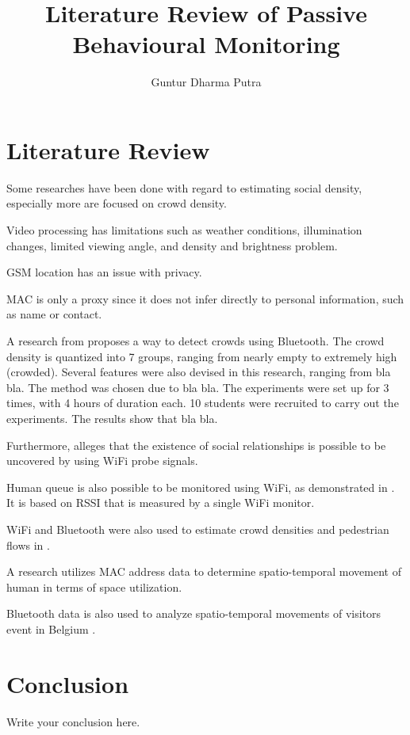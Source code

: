\documentclass{article}
\begin{document}
\title{Literature Review of Passive Behavioural Monitoring}
\author{Guntur Dharma Putra}

\maketitle


\section{Literature Review}
Some researches have been done with regard to estimating social density, especially more are focused on crowd density.

Video processing has limitations such as weather conditions, illumination changes, limited viewing angle, and density and brightness problem. 

GSM location has an issue with privacy\cite{thesis017}.

MAC is only a proxy since it does not infer directly to personal information, such as name or contact.

A research from \cite{thesis008} proposes a way to detect crowds using Bluetooth. The crowd density is quantized into 7 groups, ranging from nearly empty to extremely high (crowded). Several features were also devised in this research, ranging from bla bla. 
The method was chosen due to bla bla.
The experiments were set up for 3 times, with 4 hours of duration each. 10 students were recruited to carry out the experiments.
The results show that bla bla.

Furthermore, \cite{thesis014} alleges that the existence of social relationships is possible to be uncovered by using WiFi probe signals.

Human queue is also possible to be monitored using WiFi, as demonstrated in \cite{thesis012}. It is based on RSSI that is measured by a single WiFi monitor.

WiFi and Bluetooth were also used to estimate crowd densities and pedestrian flows in \cite{thesis011}.

A research \cite{thesis017} utilizes MAC address data to determine spatio-temporal movement of human in terms of space utilization.

Bluetooth data is also used to analyze spatio-temporal movements of visitors event in Belgium \cite{thesis016}.

\section{Conclusion}
Write your conclusion here.

{}

\end{document}
